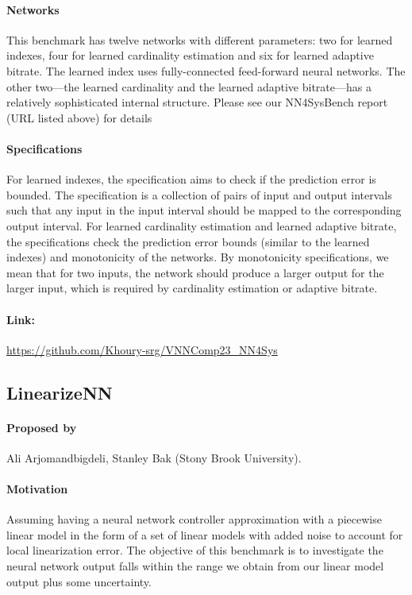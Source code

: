 \documentclass[oneside,11pt,dvipsnames]{book}
\begin{document}
\paragraph*{Networks}
This benchmark has twelve networks with different parameters: two for learned
indexes, four for learned cardinality estimation and six for learned adaptive bitrate.
The learned index uses fully-connected feed-forward neural networks. The other
two---the learned cardinality and the learned adaptive bitrate---has a
relatively sophisticated internal structure. Please see our NN4SysBench report
(URL listed above) for details


\paragraph*{Specifications}
For learned indexes,
the specification aims to check if the prediction error is bounded.
The specification is a collection of pairs of input and output intervals such that
any input in the input interval should be mapped to the corresponding output interval.
For learned cardinality estimation and learned adaptive bitrate,
the specifications check the prediction error bounds (similar to the learned indexes)
and monotonicity of the networks.
By monotonicity specifications, we mean that for two inputs, the network should produce a larger
output for the larger input, which is required by cardinality estimation or adaptive bitrate.


\paragraph{Link:} \url{https://github.com/Khoury-srg/VNNComp23_NN4Sys}



\subsection{LinearizeNN}
\paragraph*{Proposed by}  Ali Arjomandbigdeli, Stanley Bak (Stony Brook University).
\paragraph*{Motivation}
Assuming having a neural network controller approximation with a piecewise linear model in the form of a set of linear models with added noise to account for local linearization error. The objective of this benchmark is to investigate the neural network output falls within the range we obtain from our linear model output plus some uncertainty.
\end{document}
